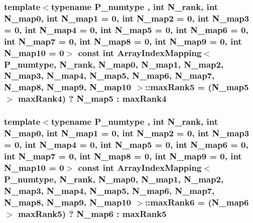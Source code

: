 \subsubsection[{max\+Rank5}]{\setlength{\rightskip}{0pt plus 5cm}template$<$typename P\+\_\+numtype , int N\+\_\+rank, int N\+\_\+map0, int N\+\_\+map1 = 0, int N\+\_\+map2 = 0, int N\+\_\+map3 = 0, int N\+\_\+map4 = 0, int N\+\_\+map5 = 0, int N\+\_\+map6 = 0, int N\+\_\+map7 = 0, int N\+\_\+map8 = 0, int N\+\_\+map9 = 0, int N\+\_\+map10 = 0$>$ const int {\bf Array\+Index\+Mapping}$<$ P\+\_\+numtype, N\+\_\+rank, N\+\_\+map0, N\+\_\+map1, N\+\_\+map2, N\+\_\+map3, N\+\_\+map4, N\+\_\+map5, N\+\_\+map6, N\+\_\+map7, N\+\_\+map8, N\+\_\+map9, N\+\_\+map10 $>$\+::max\+Rank5 = (N\+\_\+map5 $>$ {\bf max\+Rank4}) ? N\+\_\+map5 \+: {\bf max\+Rank4}\hspace{0.3cm}{\ttfamily [static]}}\label{classArrayIndexMapping_a4b9450766582f18fe4117e077f823f08}
\hypertarget{classArrayIndexMapping_a9f827f21ccc242766fb687e0dde03d3f}{}
\subsubsection[{max\+Rank6}]{\setlength{\rightskip}{0pt plus 5cm}template$<$typename P\+\_\+numtype , int N\+\_\+rank, int N\+\_\+map0, int N\+\_\+map1 = 0, int N\+\_\+map2 = 0, int N\+\_\+map3 = 0, int N\+\_\+map4 = 0, int N\+\_\+map5 = 0, int N\+\_\+map6 = 0, int N\+\_\+map7 = 0, int N\+\_\+map8 = 0, int N\+\_\+map9 = 0, int N\+\_\+map10 = 0$>$ const int {\bf Array\+Index\+Mapping}$<$ P\+\_\+numtype, N\+\_\+rank, N\+\_\+map0, N\+\_\+map1, N\+\_\+map2, N\+\_\+map3, N\+\_\+map4, N\+\_\+map5, N\+\_\+map6, N\+\_\+map7, N\+\_\+map8, N\+\_\+map9, N\+\_\+map10 $>$\+::max\+Rank6 = (N\+\_\+map6 $>$ {\bf max\+Rank5}) ? N\+\_\+map6 \+: {\bf max\+Rank5}\hspace{0.3cm}{\ttfamily [static]}}\label{classArrayIndexMapping_a9f827f21ccc242766fb687e0dde03d3f}
\hypertarget{classArrayIndexMapping_a70f6fd5b6e8e23248487b7fb047bd494}{}
